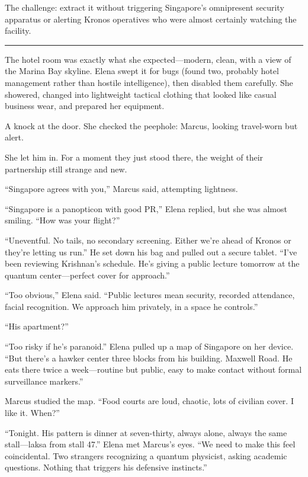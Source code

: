 The challenge: extract it without triggering Singapore's omnipresent
security apparatus or alerting Kronos operatives who were almost
certainly watching the facility.

\begin{center}\rule{0.5\linewidth}{0.5pt}\end{center}

The hotel room was exactly what she expected---modern, clean, with a
view of the Marina Bay skyline. Elena swept it for bugs (found two,
probably hotel management rather than hostile intelligence), then
disabled them carefully. She showered, changed into lightweight tactical
clothing that looked like casual business wear, and prepared her
equipment.

A knock at the door. She checked the peephole: Marcus, looking
travel-worn but alert.

She let him in. For a moment they just stood there, the weight of their
partnership still strange and new.

``Singapore agrees with you,'' Marcus said, attempting lightness.

``Singapore is a panopticon with good PR,'' Elena replied, but she was
almost smiling. ``How was your flight?''

``Uneventful. No tails, no secondary screening. Either we're ahead of
Kronos or they're letting us run.'' He set down his bag and pulled out a
secure tablet. ``I've been reviewing Krishnan's schedule. He's giving a
public lecture tomorrow at the quantum center---perfect cover for
approach.''

``Too obvious,'' Elena said. ``Public lectures mean security, recorded
attendance, facial recognition. We approach him privately, in a space he
controls.''

``His apartment?''

``Too risky if he's paranoid.'' Elena pulled up a map of Singapore on
her device. ``But there's a hawker center three blocks from his
building. Maxwell Road. He eats there twice a week---routine but public,
easy to make contact without formal surveillance markers.''

Marcus studied the map. ``Food courts are loud, chaotic, lots of
civilian cover. I like it. When?''

``Tonight. His pattern is dinner at seven-thirty, always alone, always
the same stall---laksa from stall 47.'' Elena met Marcus's eyes. ``We
need to make this feel coincidental. Two strangers recognizing a quantum
physicist, asking academic questions. Nothing that triggers his
defensive instincts.''

